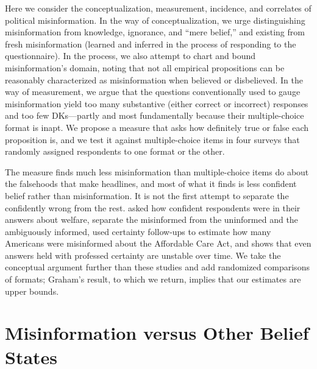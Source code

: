 \documentclass[11pt]{article}
\begin{document}
Here we consider the conceptualization, measurement, incidence, and correlates of political misinformation. In the way of conceptualization, we urge distinguishing misinformation from knowledge, ignorance, and ``mere belief,'' and existing from fresh misinformation (learned and inferred in the process of responding to the questionnaire). In the process, we also attempt to chart and bound misinformation's domain, noting that not all empirical propositions can be reasonably characterized as misinformation when believed or disbelieved. In the way of measurement, we argue that the questions conventionally used to gauge misinformation yield too many substantive (either correct or incorrect) responses and too few DKs---partly and most fundamentally because their multiple-choice format is inapt. We propose a measure that asks how definitely true or false each proposition is, and we test it against multiple-choice items in four surveys that randomly assigned respondents to one format or the other.

The measure finds much less misinformation than multiple-choice items do about the falsehoods that make headlines, and most of what it finds is less confident belief rather than misinformation. It is not the first attempt to separate the confidently wrong from the rest. \citet{kuklinski2000} asked how confident respondents were in their answers about welfare, \citet{li2020} separate the misinformed from the uninformed and the ambiguously informed, \citet{pasek2015} used certainty follow-ups to estimate how many Americans were misinformed about the Affordable Care Act, and \citet{graham2023} shows that even answers held with professed certainty are unstable over time. We take the conceptual argument further than these studies and add randomized comparisons of formats; Graham's result, to which we return, implies that our estimates are upper bounds.

\section{Misinformation versus Other Belief States}
\end{document}
